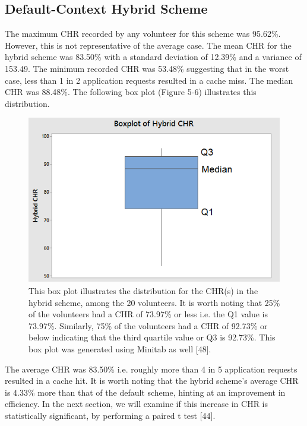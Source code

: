 \documentclass[12pt]{uthesis-v12}  %
\begin{document}
			\subsection{Default-Context Hybrid Scheme}
				The maximum CHR recorded by any volunteer for this scheme was 95.62\%. However, this is not representative of the average case. The mean CHR for the hybrid scheme was 83.50\% with a standard deviation of 12.39\% and a variance of 153.49. The minimum recorded CHR was 53.48\% suggesting that in the worst case, less than 1 in 2 application requests resulted in a cache miss. The median CHR was 88.48\%. The following box plot (Figure 5-6) illustrates this distribution.
				
				\begin{figure}[h]
					\centering
					\includegraphics[width = 130mm]{images/hybridScheme.png}
					\caption[Distribution of CHR for Hybrid Scheme]{This box plot illustrates the distribution for the CHR(s) in the hybrid scheme, among the 20 volunteers. It is worth noting that 25\% of the volunteers had a CHR of 73.97\% or less i.e. the Q1 value is 73.97\%. Similarly, 75\% of the volunteers had a CHR of 92.73\% or below indicating that the third quartile value or Q3 is 92.73\%. This box plot was generated using Minitab as well [48].}
				\end{figure}
				
				The average CHR was 83.50\% i.e. roughly more than 4 in 5 application requests resulted in a cache hit. It is worth noting that the hybrid scheme's average CHR is 4.33\% more than that of the default scheme, hinting at an improvement in efficiency. In the next section, we will examine if this increase in CHR is statistically significant, by performing a paired t test [44]. 
\end{document}
